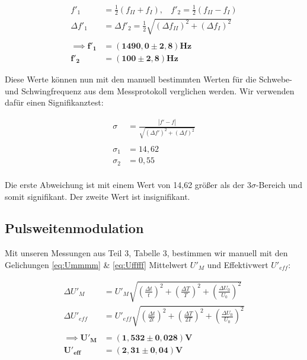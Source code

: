 \documentclass{article}
\begin{document}
\begin{equation}
    \begin{split}
        f'_1 &= \frac{1}{2} (f_{II} + f_{I}), \ \ \ \ f'_2 = \frac{1}{2} (f_{II} - f_{I}) \\
        \Delta f'_1 &= \Delta f'_2 = \frac{1}{2} \sqrt{(\Delta f_{II})^2 + (\Delta f_{I})^2} \\ \\
        \implies \bm{f'_1} &= \bm{(1490,0 \pm 2,8)} \textbf{Hz} \\
        \bm{f'_2} &= \bm{(100 \pm 2,8)} \textbf{Hz}
    \end{split}
\end{equation}

Diese Werte können nun mit den manuell bestimmten Werten für die Schwebe- und Schwingfrequenz aus dem Messprotokoll verglichen werden. Wir verwenden dafür einen Signifikanztest:

\begin{equation}
    \begin{split}
        \sigma &= \frac{|f'-f|}{\sqrt{(\Delta f')^2 + (\Delta f)^2}} \\ \\
        \sigma_1 &= 14,62 \\
        \sigma_2 &= 0,55 \\
    \end{split}
\end{equation}

Die erste Abweichung ist mit einem Wert von 14,62 größer als der 3$\sigma$-Bereich und somit signifikant. Der zweite Wert ist insignifikant.

\newpage

\subsection{Pulsweitenmodulation}

Mit unseren Messungen aus Teil 3, Tabelle 3, bestimmen wir manuell mit den Gelichungen \ref{eq:Ummmm} \& \ref{eq:Ufffff} Mittelwert $U'_M$ und Effektivwert $U'_{eff}$:

\begin{equation}
    \begin{split}
        \Delta U'_M &= U'_M \sqrt{\left( \frac{\Delta t}{t} \right)^2 + \left( \frac{\Delta T}{T} \right)^2 + \left( \frac{\Delta U_0}{U_0} \right)^2} \\
        \Delta U'_{eff} &= U'_{eff} \sqrt{\left( \frac{\Delta t}{2t} \right)^2 + \left( \frac{\Delta T}{2T} \right)^2 + \left( \frac{\Delta U_0}{U_0} \right)^2} \\ \\
        \implies \bm{U'_M} &= \bm{(1,532 \pm 0,028)} \textbf{V} \\
        \bm{U'_{eff}} &= \bm{(2,31 \pm 0,04)} \textbf{V} \\
    \end{split}
\end{equation}
\end{document}
